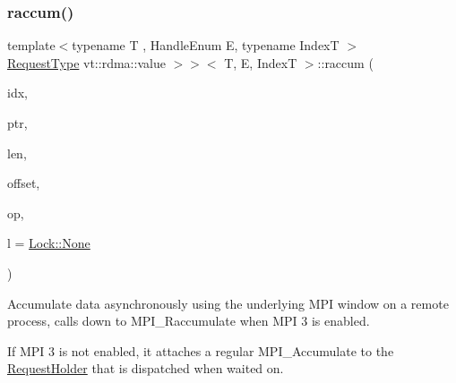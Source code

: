 \subsubsection{\texorpdfstring{raccum()}{raccum()}}
{\footnotesize\ttfamily template$<$typename T , Handle\+Enum E, typename IndexT $>$ \\
\hyperlink{structvt_1_1rdma_1_1_base_typed_handle_a449c2c1948f5793c3fdfb1aba5801ed7}{Request\+Type} vt\+::rdma\+::value $>$$>$$<$ T, E, IndexT $>$\+::raccum (\begin{DoxyParamCaption}\item[{IndexT const \&}]{idx,  }\item[{T $\ast$}]{ptr,  }\item[{std\+::size\+\_\+t}]{len,  }\item[{int}]{offset,  }\item[{M\+P\+I\+\_\+\+Op}]{op,  }\item[{\hyperlink{namespacevt_1_1rdma_ac5c20b41a653e520b6305d4d454ecb70}{Lock}}]{l = {\ttfamily \hyperlink{namespacevt_1_1rdma_ac5c20b41a653e520b6305d4d454ecb70a6adf97f83acf6453d4a6a4b1070f3754}{Lock\+::\+None}} }\end{DoxyParamCaption})}



Accumulate data asynchronously using the underlying M\+PI window on a remote process, calls down to {\ttfamily M\+P\+I\+\_\+\+Raccumulate} when M\+PI 3 is enabled. 

If M\+PI 3 is not enabled, it attaches a regular {\ttfamily M\+P\+I\+\_\+\+Accumulate} to the {\ttfamily \hyperlink{structvt_1_1rdma_1_1_request_holder}{Request\+Holder}} that is dispatched when waited on.


